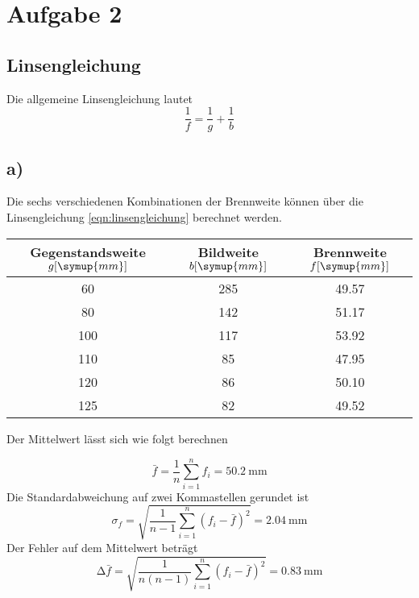 \section{Aufgabe 2}
\subsection{Linsengleichung}
Die allgemeine Linsengleichung lautet
\begin{equation}
\frac{1}{f} = \frac{1}{g} + \frac{1}{b}
\label{eqn:linsengleichung}
\end{equation}
\subsection{a)}
Die sechs verschiedenen Kombinationen der Brennweite können über die Linsengleichung \eqref{eqn:linsengleichung} berechnet werden.

\begin{table}
\centering
\label{tab:lösunga}
\begin{tabular}{c c c}
    Gegenstandsweite $g [\symup{mm}]$ & Bildweite $b [\symup{mm}]$ & Brennweite $f [\symup{mm}]$\\
    \midrule
    60 &285 &49.57\\
    80 &142 &51.17\\
    100& 117&53.92\\
    110& 85 &47.95\\
    120& 86 &50.10\\
    125& 82 &49.52\\
    \bottomrule
\end{tabular}
\end{table}
\begin{flushleft}
Der Mittelwert lässt sich wie folgt berechnen
\end{flushleft}
\begin{equation}
\bar{f} = \frac{1}{n} \sum_{i=1}^n f_i = \SI{50.2}{\milli\meter}
\label{eqn:mittelwert_f}
\end{equation}
Die Standardabweichung auf zwei Kommastellen gerundet ist
\begin{equation}
\sigma_f = \sqrt{\frac{1}{n-1} \sum_{i=1}^n (f_i - \bar{f})^2} = \SI{2.04}{\milli\meter}
\label{eqn:sigma_f}
\end{equation}
Der Fehler auf dem Mittelwert beträgt
\begin{equation}
\increment \bar{f} = \sqrt{\frac{1}{n(n-1)} \sum_{i=1}^n (f_i - \bar{f})^2} = \SI{0.83}{\milli\meter}
\label{eqn:seoftm_f}
\end{equation}
